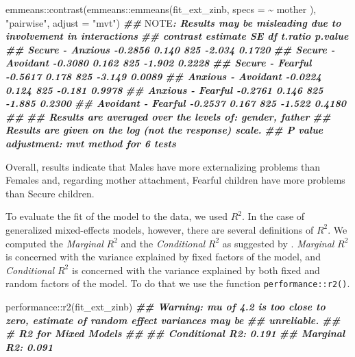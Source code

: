 \documentclass[
]{book}
\newenvironment{Shaded}{\begin{snugshade}}{\end{snugshade}}
\newcommand{\AlertTok}[1]{\textcolor[rgb]{0.94,0.16,0.16}{#1}}
\newcommand{\AttributeTok}[1]{\textcolor[rgb]{0.77,0.63,0.00}{#1}}
\newcommand{\DocumentationTok}[1]{\textcolor[rgb]{0.56,0.35,0.01}{\textbf{\textit{#1}}}}
\newcommand{\FunctionTok}[1]{\textcolor[rgb]{0.00,0.00,0.00}{#1}}
\newcommand{\NormalTok}[1]{#1}
\newcommand{\SpecialCharTok}[1]{\textcolor[rgb]{0.00,0.00,0.00}{#1}}
\newcommand{\StringTok}[1]{\textcolor[rgb]{0.31,0.60,0.02}{#1}}
\begin{document}
\begin{Shaded}
\begin{Highlighting}[]
\NormalTok{emmeans}\SpecialCharTok{::}\FunctionTok{contrast}\NormalTok{(emmeans}\SpecialCharTok{::}\FunctionTok{emmeans}\NormalTok{(fit\_ext\_zinb, }\AttributeTok{specs =} \SpecialCharTok{\textasciitilde{}}\NormalTok{ mother ),}
                  \StringTok{"pairwise"}\NormalTok{, }\AttributeTok{adjust =} \StringTok{"mvt"}\NormalTok{)}
\DocumentationTok{\#\# }\AlertTok{NOTE}\DocumentationTok{: Results may be misleading due to involvement in interactions}
\DocumentationTok{\#\#  contrast           estimate    SE  df t.ratio p.value}
\DocumentationTok{\#\#  Secure {-} Anxious    {-}0.2856 0.140 825  {-}2.034  0.1720}
\DocumentationTok{\#\#  Secure {-} Avoidant   {-}0.3080 0.162 825  {-}1.902  0.2228}
\DocumentationTok{\#\#  Secure {-} Fearful    {-}0.5617 0.178 825  {-}3.149  0.0089}
\DocumentationTok{\#\#  Anxious {-} Avoidant  {-}0.0224 0.124 825  {-}0.181  0.9978}
\DocumentationTok{\#\#  Anxious {-} Fearful   {-}0.2761 0.146 825  {-}1.885  0.2300}
\DocumentationTok{\#\#  Avoidant {-} Fearful  {-}0.2537 0.167 825  {-}1.522  0.4180}
\DocumentationTok{\#\# }
\DocumentationTok{\#\# Results are averaged over the levels of: gender, father }
\DocumentationTok{\#\# Results are given on the log (not the response) scale. }
\DocumentationTok{\#\# P value adjustment: mvt method for 6 tests}
\end{Highlighting}
\end{Shaded}

Overall, results indicate that Males have more externalizing problems than Females and, regarding mother attachment, Fearful children have more problems than Secure children.

To evaluate the fit of the model to the data, we used \(R^2\). In the case of generalized mixed-effects models, however, there are several definitions of \(R^2\). We computed the \emph{Marginal} \(R^2\) and the \emph{Conditional} \(R^2\) as suggested by \citet{nakagawaCoefficientDeterminationR22017}. \emph{Marginal} \(R^2\) is concerned with the variance explained by fixed factors of the model, and \emph{Conditional} \(R^2\) is concerned with the variance explained by both fixed and random factors of the model. To do that we use the function \texttt{performance::r2()}.

\begin{Shaded}
\begin{Highlighting}[]
\NormalTok{performance}\SpecialCharTok{::}\FunctionTok{r2}\NormalTok{(fit\_ext\_zinb)}
\DocumentationTok{\#\# Warning: mu of 4.2 is too close to zero, estimate of random effect variances may be}
\DocumentationTok{\#\#   unreliable.}
\DocumentationTok{\#\# \# R2 for Mixed Models}
\DocumentationTok{\#\# }
\DocumentationTok{\#\#   Conditional R2: 0.191}
\DocumentationTok{\#\#      Marginal R2: 0.091}
\end{Highlighting}
\end{Shaded}
\end{document}
